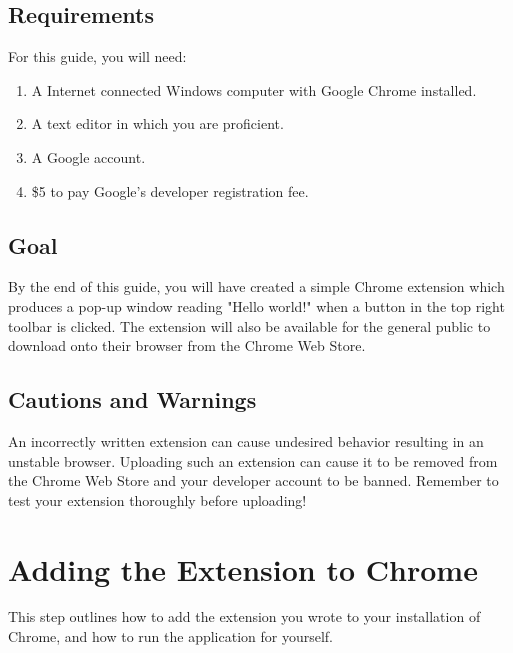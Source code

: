 \documentclass[11pt]{article}
\begin{document}
\subsection{Requirements}

For this guide, you will need:

\begin{enumerate}
	\item A Internet connected Windows computer with Google Chrome installed.
	\item A text editor in which you are proficient.
	\item A Google account.
	\item \$5 to pay Google's developer registration fee.
\end{enumerate}

\subsection{Goal}

By the end of this guide, you will have created a simple Chrome extension which produces a pop-up window reading "Hello world!" when a button in the top right toolbar is clicked. The extension will also be available for the general public to download onto their browser from the Chrome Web Store.

\subsection{Cautions and Warnings}

An incorrectly written extension can cause undesired behavior resulting in an unstable browser. Uploading such an extension can cause it to be removed from the Chrome Web Store and your developer account to be banned. Remember to test your extension thoroughly before uploading!

\newpage

\section{Adding the Extension to Chrome}

This step outlines how to add the extension you wrote to your installation of Chrome, and how to run the application for yourself.
\end{document}
